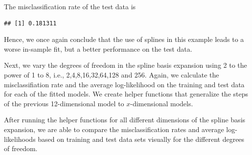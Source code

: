 \documentclass[
]{article}
\begin{document}
The misclassification rate of the test data is

\begin{verbatim}
## [1] 0.181311
\end{verbatim}

Hence, we once again conclude that the use of splines in this example
leads to a worse in-sample fit, but a better performance on the test
data.

Next, we vary the degrees of freedom in the spline basis expansion using
2 to the power of 1 to 8, i.e., 2,4,8,16,32,64,128 and 256. Again, we
calculate the misclassifiation rate and the average log-likelihood on
the training and test data for each of the fitted models. We create
helper functions that generalize the steps of the previous
12-dimensional model to \(x\)-dimensional models.

After running the helper functions for all different dimensions of the
spline basis expansion, we are able to compare the misclassification
rates and average log-likelihoods based on training and test data sets
visually for the different degrees of freedom.
\end{document}
